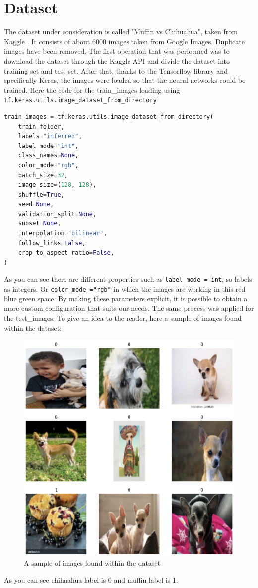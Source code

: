 \chapter{Dataset} \label{ch:dataset}
The dataset under consideration is called "Muffin vs Chihuahua", taken from Kaggle \cite{kaggle}.
It consists of about 6000 images taken from Google Images. Duplicate images have been removed.
The first operation that was performed was to download the dataset through the Kaggle API and divide the dataset into training set and test set. After that, thanks to the Tensorflow library and specifically Keras, the images were loaded so that the neural networks could be trained. Here the code for the train\_images loading using \texttt{tf.keras.utils.image\_dataset\_from\_directory}
\begin{lstlisting}[language=Python]
train_images = tf.keras.utils.image_dataset_from_directory(
    train_folder,
    labels="inferred",
    label_mode="int",
    class_names=None,
    color_mode="rgb",
    batch_size=32,
    image_size=(128, 128),
    shuffle=True,
    seed=None,
    validation_split=None,
    subset=None,
    interpolation="bilinear",
    follow_links=False,
    crop_to_aspect_ratio=False,
)
\end{lstlisting}
As you can see there are different properties such as \texttt{label\_mode = int}, so labels as integers. Or \texttt{color\_mode ="rgb"} in which the images are working in this red blue green space. By making these parameters explicit, it is possible to obtain a more custom configuration that suits our needs. The same process was applied for the test\_images.
To give an idea to the reader, here a sample of images found within the dataset:
\begin{figure}[hbtp]
\caption{A sample of images found within the dataset}
\centering
\includegraphics[scale=0.5]{../Images/sampleimages.png}
\end{figure}
As you can see chihuahua label is 0 and muffin label is 1.
